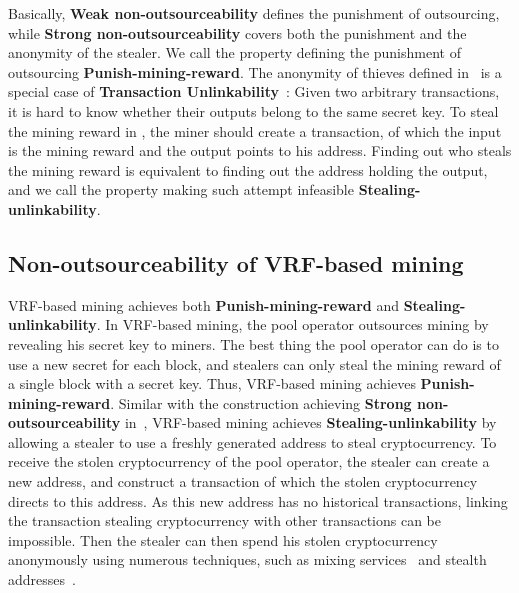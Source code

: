 Basically, \textbf{Weak non-outsourceability} defines the punishment of outsourcing, while \textbf{Strong non-outsourceability} covers both the punishment and the anonymity of the stealer.
We call the property defining the punishment of outsourcing \textbf{Punish-mining-reward}.
The anonymity of thieves defined in~\cite{miller2015nonoutsourceable} is a special case of \textbf{Transaction Unlinkability}~\cite{van2013cryptonote}: Given two arbitrary transactions, it is hard to know whether their outputs belong to the same secret key.
To steal the mining reward in \cite{miller2015nonoutsourceable}, the miner should create a transaction, of which the input is the mining reward and the output points to his address.
Finding out who steals the mining reward is equivalent to finding out the address holding the output, and we call the property making such attempt infeasible \textbf{Stealing-unlinkability}.




\subsection{Non-outsourceability of VRF-based mining}

VRF-based mining achieves both \textbf{Punish-mining-reward} and \textbf{Stealing-unlinkability}.
In VRF-based mining, the pool operator outsources mining by revealing his secret key to miners.
The best thing the pool operator can do is to use a new secret for each block, and stealers can only steal the mining reward of a single block with a secret key.
Thus, VRF-based mining achieves \textbf{Punish-mining-reward}.
Similar with the construction achieving \textbf{Strong non-outsourceability} in~\cite{miller2015nonoutsourceable}, VRF-based mining achieves \textbf{Stealing-unlinkability} by allowing a stealer to use a freshly generated address to steal cryptocurrency.
To receive the stolen cryptocurrency of the pool operator, the stealer can create a new address, and construct a transaction of which the stolen cryptocurrency directs to this address.
As this new address has no historical transactions, linking the transaction stealing cryptocurrency with other transactions can be impossible.
Then the stealer can then spend his stolen cryptocurrency anonymously using numerous techniques, such as mixing services~\cite{maxwell2013coinjoin}\cite{bonneau2014mixcoin}\cite{ruffing2014coinshuffle}\cite{heilman2017tumblebit} and stealth addresses~\cite{van2013cryptonote}.


